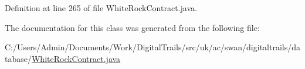 Definition at line 265 of file White\+Rock\+Contract.\+java.



The documentation for this class was generated from the following file\+:\begin{DoxyCompactItemize}
\item 
C\+:/\+Users/\+Admin/\+Documents/\+Work/\+Digital\+Trails/src/uk/ac/swan/digitaltrails/database/\hyperlink{_white_rock_contract_8java}{White\+Rock\+Contract.\+java}\end{DoxyCompactItemize}
